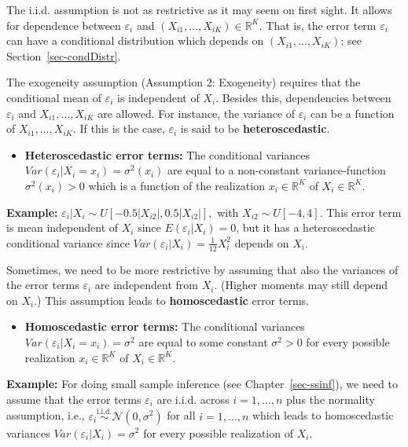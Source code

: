 \documentclass[
  letterpaper,
  DIV=11,
  numbers=noendperiod]{scrreprt}
\providecommand{\tightlist}{%
  \setlength{\itemsep}{0pt}\setlength{\parskip}{0pt}}\usepackage{longtable,booktabs,array}
\theoremstyle{definition}
\theoremstyle{plain}
\theoremstyle{plain}
\theoremstyle{remark}
\begin{document}
The i.i.d. assumption is not as restrictive as it may seem on first
sight. It allows for dependence between \(\varepsilon_i\) and
\((X_{i1},\dots,X_{iK})\in\mathbb{R}^K\). That is, the error term
\(\varepsilon_i\) can have a conditional distribution which depends on
\((X_{i1},\dots,X_{iK})\); see Section~\ref{sec-condDistr}.

The exogeneity assumption (Assumption 2: Exogeneity) requires that the
conditional mean of \(\varepsilon_i\) is independent of \(X_i\). Besides
this, dependencies between \(\varepsilon_i\) and \(X_{i1},\dots,X_{iK}\)
are allowed. For instance, the variance of \(\varepsilon_i\) can be a
function of \(X_{i1},\dots,X_{iK}\). If this is the case,
\(\varepsilon_i\) is said to be \textbf{heteroscedastic}.

\begin{itemize}
\tightlist
\item
  \textbf{Heteroscedastic error terms:} The conditional variances
  \(Var(\varepsilon_i|X_i=x_i)=\sigma^2(x_i)\) are equal to a
  non-constant variance-function \(\sigma^2(x_i)>0\) which is a function
  of the realization \(x_i\in\mathbb{R}^K\) of \(X_i\in\mathbb{R}^K\).
\end{itemize}

\textbf{Example:}
\(\varepsilon_i|X_i\sim U[-0.5|X_{i2}|, 0.5|X_{i2}|],\) with
\(X_{i2}\sim U[-4,4]\). This error term is mean independent of \(X_i\)
since \(E(\varepsilon_i|X_i)=0\), but it has a heteroscedastic
conditional variance since \(Var(\varepsilon_i|X_i)=\frac{1}{12}X_i^2\)
depends on \(X_i\).

Sometimes, we need to be more restrictive by assuming that also the
variances of the error terms \(\varepsilon_i\) are independent from
\(X_i\). (Higher moments may still depend on \(X_i\).) This assumption
leads to \textbf{homoscedastic} error terms.

\begin{itemize}
\tightlist
\item
  \textbf{Homoscedastic error terms:} The conditional variances
  \(Var(\varepsilon_i|X_i=x_i)=\sigma^2\) are equal to some constant
  \(\sigma^2>0\) for every possible realization \(x_i\in\mathbb{R}^K\)
  of \(X_i\in\mathbb{R}^K\).
\end{itemize}

\textbf{Example:} For doing small sample inference (see
Chapter~\ref{sec-ssinf}), we need to assume that the error terms
\(\varepsilon_i\) are i.i.d. across \(i=1,\dots,n\) plus the normality
assumption, i.e.,
\(\varepsilon_i\stackrel{\textrm{i.i.d.}}{\sim}{\mathcal N} (0, \sigma^2)\)
for all \(i=1,\dots,n\) which leads to homoscedastic variances
\(Var(\varepsilon_i|X_i)=\sigma^2\) for every possible realization of
\(X_i\).
\end{document}
